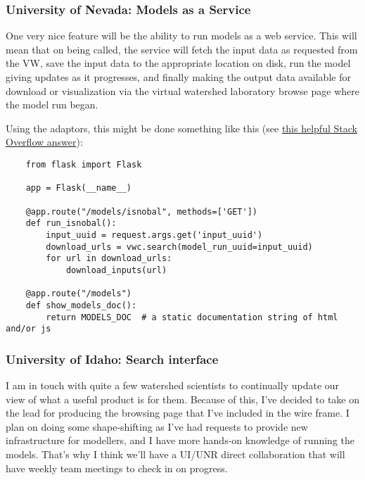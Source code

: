 \documentclass[
11pt, %
a4paper, %
oneside, %
twoside, %
headinclude,footinclude, %
BCOR5mm, %
]{scrartcl}
\begin{document}

\subsubsection{University of Nevada: Models as a Service} %
\label{ssub:UNR_maas}

One very nice feature will be the ability to run models as a web service. This will mean that
on being called, the service will fetch the input data as requested from the VW, save the input
data to the appropriate location on disk, run the model giving updates as it progresses, and 
finally making the output data available for download or visualization via the virtual watershed
laboratory browse page where the model run began.

Using the adaptors, this might be done something like this 
(see \href{http://stackoverflow.com/questions/15182696/multiple-parameters-in-in-flask-approute}{this helpful Stack Overflow answer}):

\begin{verbatim}
    from flask import Flask

    app = Flask(__name__)

    @app.route("/models/isnobal", methods=['GET'])
    def run_isnobal():
        input_uuid = request.args.get('input_uuid')
        download_urls = vwc.search(model_run_uuid=input_uuid)
        for url in download_urls:
            download_inputs(url)

    @app.route("/models")
    def show_models_doc():
        return MODELS_DOC  # a static documentation string of html and/or js
\end{verbatim}


\subsubsection{University of Idaho: Search interface} %
\label{ssub:UI_search_interface}

I am in touch with quite a few watershed scientists to continually update our view of what
a useful product is for them. Because of this, I've decided to take on the lead for 
producing the browsing page that I've included in the wire frame. I plan on doing some 
shape-shifting as I've had requests to provide new infrastructure for modellers, and I have 
more hands-on knowledge of running the models. That's why I think we'll have a UI/UNR 
direct collaboration that will have weekly team meetings to check in on progress.
\end{document}
